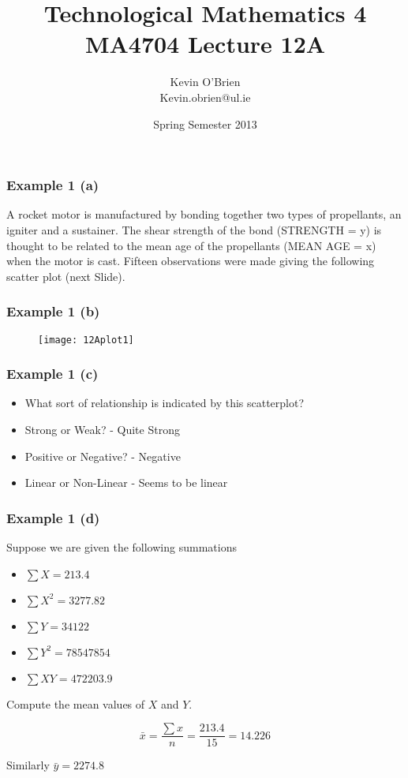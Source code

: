 \documentclass[a4]{beamer}
\title[MA4704]{Technological Mathematics 4 \\ {\normalsize MA4704 Lecture 12A}}
\author[Kevin O'Brien]{Kevin O'Brien \\ {\scriptsize Kevin.obrien@ul.ie}}
\date{Spring Semester 2013}
\institute[Maths \& Stats]{Dept. of Mathematics \& Statistics, \\ University \textit{of} Limerick}
\begin{document}
\begin{frame}
\titlepage
\end{frame}
\begin{frame}
\frametitle{Example 1 (a)}
A rocket motor is manufactured by bonding together two types of
propellants, an igniter and a sustainer.
The shear strength of the bond (STRENGTH = y)
is thought to be related to the mean age of the propellants (MEAN AGE = x) when the motor is cast.
Fifteen observations were made giving the following scatter plot (next Slide).
\end{frame}

\begin{frame}
\frametitle{Example 1 (b)}

\begin{figure}
  \texttt{[image: 12Aplot1]}\\
\end{figure}

\end{frame}
\begin{frame}
\frametitle{Example 1 (c)}
\begin{itemize}
\item What sort of relationship is indicated by this scatterplot?
\item Strong or Weak?  - Quite Strong
\item Positive or Negative?  - Negative
\item Linear or Non-Linear - Seems to be linear
\end{itemize}
\end{frame}
\begin{frame}
\frametitle{Example 1 (d)}
Suppose we are given the following summations
\begin{itemize}
\item $\sum X = 213.4$
\item $\sum X^2 =3277.82$
\item $\sum Y = 34122$
\item $\sum Y^2 = 78547854$
\item $\sum XY = 472203.9$
\end{itemize}
Compute the mean values of $X$ and $Y$.

\[ \bar{x} = \frac{\sum x}{n} = \frac{213.4}{15} = 14.226 \]

Similarly $\bar{y} =  2274.8$

\end{frame}
\end{document}
